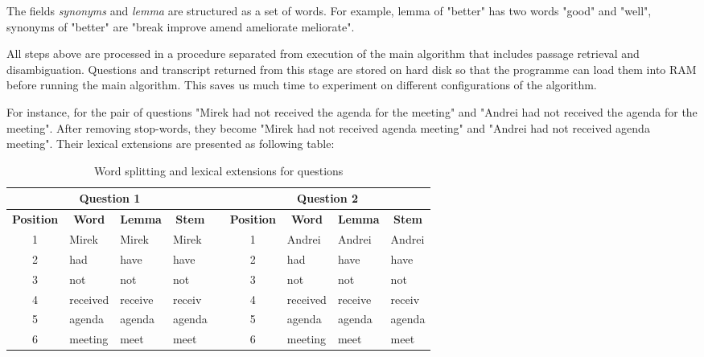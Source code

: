 \documentclass[10pt,a4paper]{article}
\numberwithin{algorithm}{section}  %
\begin{document}
The fields \textit{synonyms} and \textit{lemma} are structured as a set of words. For example, lemma of "better" has two words "good" and "well", synonyms of "better" are "break improve amend ameliorate meliorate".

All steps above are processed in a procedure separated from execution of the main algorithm that includes passage retrieval and disambiguation. Questions and transcript returned from this stage are stored on hard disk so that the programme can load them into RAM before running the main algorithm. This saves us much time to experiment on different configurations of the algorithm.

For instance, for the pair of questions "Mirek had not received the agenda for the meeting" and "Andrei had not received the agenda for the meeting". After removing stop-words, they become "Mirek had not received agenda meeting" and "Andrei had not received agenda meeting". Their lexical extensions are presented as following table:


\begin{table}[htbp]
\scriptsize
\caption{Word splitting and lexical extensions for questions}
\begin{tabular}{|c|l|l|l|l|c|l|l|l|}
\hline
\multicolumn{ 4}{|c|}{\textbf{Question 1}} &  & \multicolumn{ 4}{c|}{\textbf{Question 2}} \\ \hline
\textbf{Position} & \multicolumn{1}{c|}{\textbf{Word}} & \multicolumn{1}{c|}{\textbf{Lemma}} & \multicolumn{1}{c|}{\textbf{Stem}} &  & \textbf{Position} & \multicolumn{1}{c|}{\textbf{Word}} & \multicolumn{1}{c|}{\textbf{Lemma}} & \multicolumn{1}{c|}{\textbf{Stem}} \\ \hline
1 & Mirek & Mirek & Mirek &  & 1 & Andrei & Andrei & Andrei \\ \hline
2 & had & have & have &  & 2 & had & have & have \\ \hline
3 & not & not & not &  & 3 & not & not & not \\ \hline
4 & received & receive & receiv &  & 4 & received & receive & receiv \\ \hline
5 & agenda & agenda & agenda &  & 5 & agenda & agenda & agenda \\ \hline
6 & meeting & meet & meet &  & 6 & meeting & meet & meet \\ \hline
\end{tabular}
\label{Word splitting and lexical extensions for questions}
\end{table}
\end{document}
